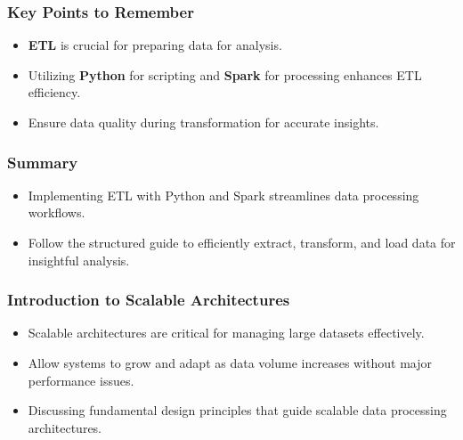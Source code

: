 \documentclass[aspectratio=169]{beamer}
\begin{document}
\begin{frame}
    \frametitle{Key Points to Remember}
    \begin{itemize}
        \item \textbf{ETL} is crucial for preparing data for analysis.
        \item Utilizing \textbf{Python} for scripting and \textbf{Spark} for processing enhances ETL efficiency.
        \item Ensure data quality during transformation for accurate insights.
    \end{itemize}
\end{frame}

\begin{frame}
    \frametitle{Summary}
    \begin{itemize}
        \item Implementing ETL with Python and Spark streamlines data processing workflows.
        \item Follow the structured guide to efficiently extract, transform, and load data for insightful analysis.
    \end{itemize}
\end{frame}

\begin{frame}[fragile]
    \frametitle{Introduction to Scalable Architectures}
    \begin{itemize}
        \item Scalable architectures are critical for managing large datasets effectively.
        \item Allow systems to grow and adapt as data volume increases without major performance issues.
        \item Discussing fundamental design principles that guide scalable data processing architectures.
    \end{itemize}
\end{frame}
\end{document}
